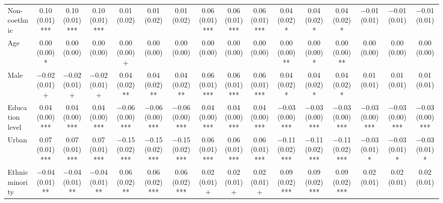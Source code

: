 \begin{table}
\begin{tabular}[t]{lccccccccccccccc}
Non-coethnic & \num{0.10} (\num{0.01})*** & \num{0.10} (\num{0.01})*** & \num{0.10} (\num{0.01})*** & \num{0.01} (\num{0.02}) & \num{0.01} (\num{0.02}) & \num{0.01} (\num{0.02}) & \num{0.06} (\num{0.01})*** & \num{0.06} (\num{0.01})*** & \num{0.06} (\num{0.01})*** & \num{0.04} (\num{0.02})* & \num{0.04} (\num{0.02})* & \num{0.04} (\num{0.02})* & \num{-0.01} (\num{0.01}) & \num{-0.01} (\num{0.01}) & \num{-0.01} (\num{0.01})\\
Age & \num{0.00} (\num{0.00})* & \num{0.00} (\num{0.00}) & \num{0.00} (\num{0.00}) & \num{0.00} (\num{0.00})+ & \num{0.00} (\num{0.00}) & \num{0.00} (\num{0.00}) & \num{0.00} (\num{0.00}) & \num{0.00} (\num{0.00}) & \num{0.00} (\num{0.00}) & \num{0.00} (\num{0.00})** & \num{0.00} (\num{0.00})* & \num{0.00} (\num{0.00})** & \num{0.00} (\num{0.00}) & \num{0.00} (\num{0.00}) & \num{0.00} (\num{0.00})\\
Male & \num{-0.02} (\num{0.01})+ & \num{-0.02} (\num{0.01})+ & \num{-0.02} (\num{0.01})+ & \num{0.04} (\num{0.02})** & \num{0.04} (\num{0.02})** & \num{0.04} (\num{0.02})** & \num{0.06} (\num{0.01})*** & \num{0.06} (\num{0.01})*** & \num{0.06} (\num{0.01})*** & \num{0.04} (\num{0.02})* & \num{0.04} (\num{0.02})* & \num{0.04} (\num{0.02})* & \num{0.01} (\num{0.01}) & \num{0.01} (\num{0.01}) & \num{0.01} (\num{0.01})\\
Education level & \num{0.04} (\num{0.00})*** & \num{0.04} (\num{0.00})*** & \num{0.04} (\num{0.00})*** & \num{-0.06} (\num{0.00})*** & \num{-0.06} (\num{0.00})*** & \num{-0.06} (\num{0.00})*** & \num{0.04} (\num{0.00})*** & \num{0.04} (\num{0.00})*** & \num{0.04} (\num{0.00})*** & \num{-0.03} (\num{0.00})*** & \num{-0.03} (\num{0.00})*** & \num{-0.03} (\num{0.00})*** & \num{-0.03} (\num{0.00})*** & \num{-0.03} (\num{0.00})*** & \num{-0.03} (\num{0.00})***\\
Urban & \num{0.07} (\num{0.01})*** & \num{0.07} (\num{0.01})*** & \num{0.07} (\num{0.01})*** & \num{-0.15} (\num{0.02})*** & \num{-0.15} (\num{0.02})*** & \num{-0.15} (\num{0.02})*** & \num{0.06} (\num{0.01})*** & \num{0.06} (\num{0.01})*** & \num{0.06} (\num{0.01})*** & \num{-0.11} (\num{0.02})*** & \num{-0.11} (\num{0.02})*** & \num{-0.11} (\num{0.02})*** & \num{-0.03} (\num{0.01})* & \num{-0.03} (\num{0.01})* & \num{-0.03} (\num{0.01})*\\
Ethnic minority & \num{-0.04} (\num{0.01})** & \num{-0.04} (\num{0.01})** & \num{-0.04} (\num{0.01})** & \num{0.06} (\num{0.02})** & \num{0.06} (\num{0.02})*** & \num{0.06} (\num{0.02})*** & \num{0.02} (\num{0.01})+ & \num{0.02} (\num{0.01})+ & \num{0.02} (\num{0.01})+ & \num{0.09} (\num{0.02})*** & \num{0.09} (\num{0.02})*** & \num{0.09} (\num{0.02})*** & \num{0.02} (\num{0.01}) & \num{0.02} (\num{0.01}) & \num{0.02} (\num{0.01})\\

\end{tabular}
\end{table}
